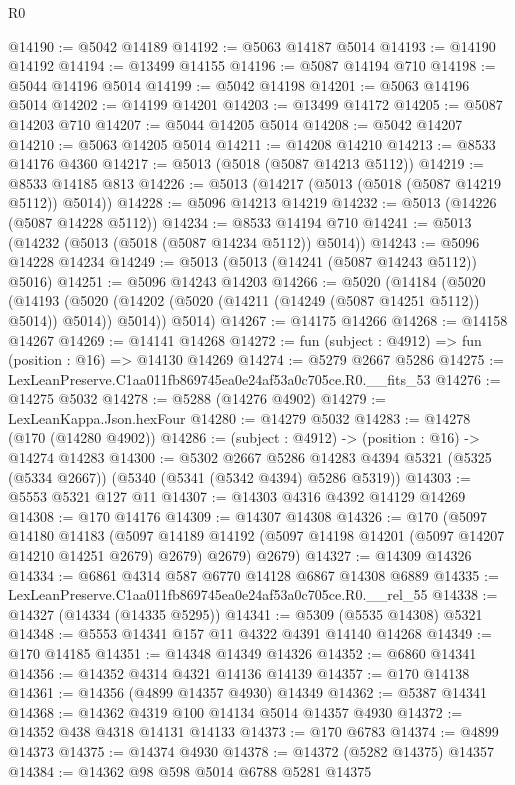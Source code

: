 \begin{lexlean}{R0}
\begin{coremodule}
@14190 := @5042 @14189
@14192 := @5063 @14187 @5014
@14193 := @14190 @14192
@14194 := @13499 @14155
@14196 := @5087 @14194 @710
@14198 := @5044 @14196 @5014
@14199 := @5042 @14198
@14201 := @5063 @14196 @5014
@14202 := @14199 @14201
@14203 := @13499 @14172
@14205 := @5087 @14203 @710
@14207 := @5044 @14205 @5014
@14208 := @5042 @14207
@14210 := @5063 @14205 @5014
@14211 := @14208 @14210
@14213 := @8533 @14176 @4360
@14217 := @5013 (@5018 (@5087 @14213 @5112))
@14219 := @8533 @14185 @813
@14226 := @5013 (@14217 (@5013 (@5018 (@5087 @14219 @5112)) @5014))
@14228 := @5096 @14213 @14219
@14232 := @5013 (@14226 (@5087 @14228 @5112))
@14234 := @8533 @14194 @710
@14241 := @5013 (@14232 (@5013 (@5018 (@5087 @14234 @5112)) @5014))
@14243 := @5096 @14228 @14234
@14249 := @5013 (@5013 (@14241 (@5087 @14243 @5112)) @5016)
@14251 := @5096 @14243 @14203
@14266 := @5020
    (@14184
      (@5020
        (@14193 (@5020 (@14202 (@5020 (@14211 (@14249 (@5087 @14251 @5112)) @5014)) @5014)) @5014))
      @5014)
@14267 := @14175 @14266
@14268 := @14158 @14267
@14269 := @14141 @14268
@14272 := fun (subject : @4912) => fun (position : @16) => @14130 @14269
@14274 := @5279 @2667 @5286
@14275 := LexLeanPreserve.C1aa011fb869745ea0e24af53a0c705ce.R0.__fits_53
@14276 := @14275 @5032
@14278 := @5288 (@14276 @4902)
@14279 := LexLeanKappa.Json.hexFour
@14280 := @14279 @5032
@14283 := @14278 (@170 (@14280 @4902))
@14286 := (subject : @4912) -> (position : @16) -> @14274 @14283
@14300 := @5302
    @2667
    @5286
    @14283
    @4394
    @5321
    (@5325 (@5334 @2667))
    (@5340 (@5341 (@5342 @4394) @5286 @5319))
@14303 := @5553 @5321 @127 @11
@14307 := @14303 @4316 @4392 @14129 @14269
@14308 := @170 @14176
@14309 := @14307 @14308
@14326 := @170
    (@5097
      @14180
      @14183
      (@5097 @14189 @14192 (@5097 @14198 @14201 (@5097 @14207 @14210 @14251 @2679) @2679) @2679)
      @2679)
@14327 := @14309 @14326
@14334 := @6861 @4314 @587 @6770 @14128 @6867 @14308 @6889
@14335 := LexLeanPreserve.C1aa011fb869745ea0e24af53a0c705ce.R0.__rel_55
@14338 := @14327 (@14334 (@14335 @5295))
@14341 := @5309 (@5535 @14308) @5321
@14348 := @5553 @14341 @157 @11 @4322 @4391 @14140 @14268
@14349 := @170 @14185
@14351 := @14348 @14349 @14326
@14352 := @6860 @14341
@14356 := @14352 @4314 @4321 @14136 @14139
@14357 := @170 @14138
@14361 := @14356 (@4899 @14357 @4930) @14349
@14362 := @5387 @14341
@14368 := @14362 @4319 @100 @14134 @5014 @14357 @4930
@14372 := @14352 @438 @4318 @14131 @14133
@14373 := @170 @6783
@14374 := @4899 @14373
@14375 := @14374 @4930
@14378 := @14372 (@5282 @14375) @14357
@14384 := @14362 @98 @598 @5014 @6788 @5281 @14375

\end{coremodule}
\end{lexlean}
